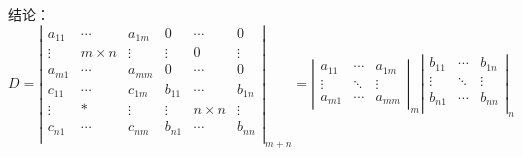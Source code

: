 {\color{blue}结论：}
$$
D={{\left| \begin{matrix}
    {{a}_{11}} & \cdots  & {{a}_{1m}} & 0 & \cdots  & 0  \\
    \vdots  & {m\times n} & \vdots  & \vdots  & {0} & \vdots   \\
    {{a}_{m1}} & \cdots  & {{a}_{mm}} & 0 & \cdots  & 0  \\
    {{c}_{11}} & \cdots  & {{c}_{1m}} & {{b}_{11}} & \cdots  & {{b}_{1n}}  \\
    \vdots  & {*} & \vdots  & \vdots  & {n\times n} & \vdots   \\
    {{c}_{n1}} & \cdots  & {{c}_{nm}} & {{b}_{n1}} & \cdots  & {{b}_{nn}}  \\
 \end{matrix} \right|}_{m+n}}
=\left|
\begin{matrix}
    a_{11} & \cdots  & a_{1m}  \\
    \vdots  & \ddots & \vdots   \\
    a_{m1} & \cdots  & a_{mm}
\end{matrix}\right|_{m}
\left|\begin{matrix}
    b_{11} & \cdots  & b_{1n}  \\
    \vdots  & \ddots & \vdots   \\
    b_{n1} & \cdots  & b_{nn} \\
\end{matrix} \right|_{n}
$$
